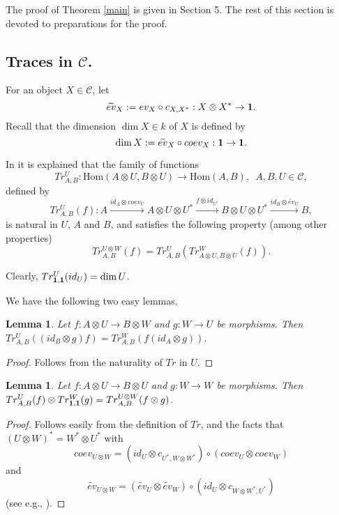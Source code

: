 \documentclass{amsart}
\newtheorem{lemma}[theorem]{Lemma}
\theoremstyle{definition}
\newcommand{\Hom}{\text{Hom}}
\newcommand{\ot}{\otimes}
\newcommand{\C}{{\mathcal C}}
\newcommand{\unit}{{\bf 1}}
\begin{document}
The proof of Theorem \ref{main} is given in Section 5. The rest of
this section is devoted to preparations for the proof.

\subsection{Traces in $\C$.}
For an object $X\in \mathcal{C}$, let $$\widetilde{ev}_X:=ev_X\circ
c_{X,X^*}: X\ot X^*\to \unit.$$ Recall that the dimension $\dim X\in
k$ of $X$ is defined by $$\dim X:=\widetilde{ev}_X\circ
coev_X:\unit\to \unit.$$

In \cite{jsv} it is explained that the family of functions
$$Tr_{A,B}^U:\Hom(A\ot U,B\ot U)\to \Hom(A,B),\,\,\, A,B,U\in \C,$$
defined by
\begin{equation}
\label{trace} Tr_{A,B}^U(f):A \xrightarrow{id_A\ot coev_U} A\ot U\ot
U^* \xrightarrow{f\ot id_{U^*}} B\ot U\ot U^*\xrightarrow{id_B\ot
\widetilde{ev}_U} B,
\end{equation}
is natural in $U$, $A$ and $B$, and satisfies the following property
(among other properties)
\begin{equation}\label{van}
Tr_{A,B}^{U\ot W}(f)=Tr_{A,B}^{U}(Tr_{A\ot U,B\ot U}^{W}(f)).
\end{equation}

Clearly, $Tr_{\unit,\unit}^U(id_U)=\dim U$.

We have the following two easy lemmas.
\begin{lemma}\label{trace1}
Let $f:A\ot U\to B\ot W$ and $g:W\to U$ be morphisms. Then
$Tr_{A,B}^U((id_B\ot g)f)=Tr_{A,B}^W(f(id_A\ot g))$.
\end{lemma}

\begin{proof}
Follows from the naturality of $Tr$ in $U$.
\end{proof}

\begin{lemma}\label{trace2}
Let $f:A\ot U\to B\ot U$ and $g:W\to W$ be morphisms. Then
$Tr_{A,B}^U(f)\ot Tr_{\unit,\unit}^W(g)=Tr_{A,B}^{U\ot W}(f\ot g)$.
\end{lemma}

\begin{proof}
Follows easily from the definition of $Tr$, and the facts that
$(U\ot W)^*=W^*\ot U^*$ with $$coev_{U\ot W}=(id_U\ot c_{U^*,W\ot
W^*})\circ(coev_U\ot coev_W)$$ and $$\widetilde{ev}_{U\ot
W}=(\widetilde{ev}_U\ot \widetilde{ev}_W)\circ(id_U\ot c_{W\ot
W^*,U^*})$$ (see e.g., \cite{bk}).
\end{proof}
\end{document}
